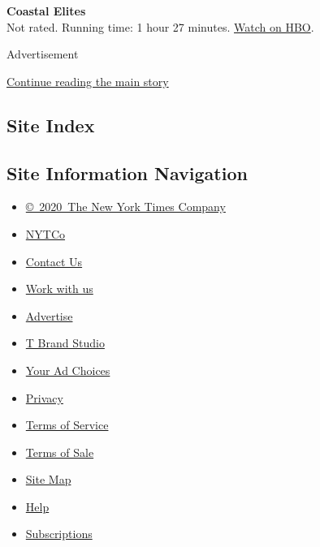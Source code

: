 \textbf{Coastal Elites}\\
Not rated. Running time: 1 hour 27 minutes.
\href{https://www.hbomax.com/}{Watch on HBO}.

Advertisement

\protect\hyperlink{after-bottom}{Continue reading the main story}

\hypertarget{site-index}{%
\subsection{Site Index}\label{site-index}}

\hypertarget{site-information-navigation}{%
\subsection{Site Information
Navigation}\label{site-information-navigation}}

\begin{itemize}
\tightlist
\item
  \href{https://help.nytimes3xbfgragh.onion/hc/en-us/articles/115014792127-Copyright-notice}{©~2020~The
  New York Times Company}
\end{itemize}

\begin{itemize}
\tightlist
\item
  \href{https://www.nytco.com/}{NYTCo}
\item
  \href{https://help.nytimes3xbfgragh.onion/hc/en-us/articles/115015385887-Contact-Us}{Contact
  Us}
\item
  \href{https://www.nytco.com/careers/}{Work with us}
\item
  \href{https://nytmediakit.com/}{Advertise}
\item
  \href{http://www.tbrandstudio.com/}{T Brand Studio}
\item
  \href{https://www.nytimes3xbfgragh.onion/privacy/cookie-policy\#how-do-i-manage-trackers}{Your
  Ad Choices}
\item
  \href{https://www.nytimes3xbfgragh.onion/privacy}{Privacy}
\item
  \href{https://help.nytimes3xbfgragh.onion/hc/en-us/articles/115014893428-Terms-of-service}{Terms
  of Service}
\item
  \href{https://help.nytimes3xbfgragh.onion/hc/en-us/articles/115014893968-Terms-of-sale}{Terms
  of Sale}
\item
  \href{https://spiderbites.nytimes3xbfgragh.onion}{Site Map}
\item
  \href{https://help.nytimes3xbfgragh.onion/hc/en-us}{Help}
\item
  \href{https://www.nytimes3xbfgragh.onion/subscription?campaignId=37WXW}{Subscriptions}
\end{itemize}
